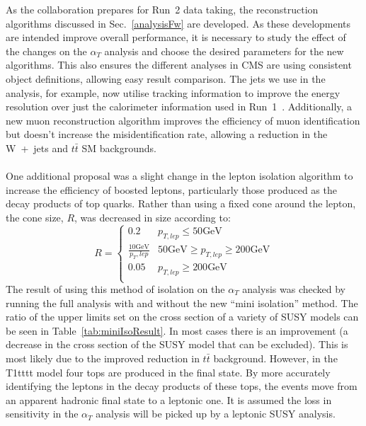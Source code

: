 \noindent As the collaboration prepares for Run~2 data taking, the reconstruction algorithms discussed in Sec.~\ref{analysisFw} are developed. As these developments are intended improve overall performance, it is necessary to study the effect of the changes on the $\alpha_T$ analysis and choose the desired parameters for the new algorithms. This also ensures the different analyses in CMS are using consistent object definitions, allowing easy result comparison. The jets we use in the analysis, for example, now utilise tracking information to improve the energy resolution over just the calorimeter information used in Run~1~\cite{ParticleFlow}. Additionally, a new muon reconstruction algorithm improves the efficiency of muon identification but doesn't increase the misidentification rate, allowing a reduction in the W~+~jets and $t\bar{t}$ SM backgrounds. 
\\\\
One additional proposal was a slight change in the lepton isolation algorithm to increase the efficiency of boosted leptons, particularly those produced as the decay products of top quarks. Rather than using a fixed cone around the lepton, the cone size, $R$, was decreased in size according to:
\begin{equation}
R =
  \begin{cases}
    0.2       & p_{T,lep} \leq 50\textrm{GeV}\\
    \frac{10\textrm{GeV}}{p_T,lep}       & 50\textrm{GeV}\geq p_{T,lep} \geq 200\textrm{GeV}\\
    0.05     &  p_{T,lep} \geq 200\textrm{GeV}\\
  \end{cases}
\end{equation}
The result of using this method of isolation on the $\alpha_T$ analysis was checked by running the full analysis with and without the new ``mini isolation'' method. The ratio of the upper limits set on the cross section of a variety of SUSY models can be seen in Table~\ref{tab:miniIsoResult}. In most cases there is an improvement (a decrease in the cross section of the SUSY model that can be excluded). This is most likely due to the improved reduction in $t\bar{t}$ background. However, in the T1tttt model four tops are produced in the final state. By more accurately identifying the leptons in the decay products of these tops, the events move from an apparent hadronic final state to a leptonic one. It is assumed the loss in sensitivity in the $\alpha_T$ analysis will be picked up by a leptonic SUSY analysis.
